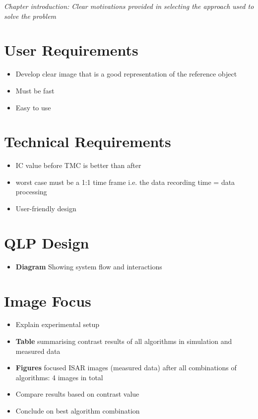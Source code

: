 \documentclass[class=report,11pt,crop=false]{standalone}
\begin{document}
\emph{Chapter introduction: Clear motivations provided in selecting the approach used to solve the problem}

\section{User Requirements}
\begin{itemize}
    \item Develop clear image that is a good representation of the reference object
    \item Must be fast
    \item Easy to use
\end{itemize}

\section{Technical Requirements}
\begin{itemize}
    \item IC value before TMC is better than after
    \item worst case must be a 1:1 time frame i.e. the data recording time = data processing
    \item User-friendly design
\end{itemize}

\section{QLP Design}
\begin{itemize}
    \item \textbf{Diagram} Showing system flow and interactions
\end{itemize}

\section{Image Focus}
\begin{itemize}
    \item Explain experimental setup
    \item \textbf{Table} summarising contrast results of all algorithms in simulation and measured data
    \item \textbf{Figures} focused ISAR images (measured data) after all combinations of algorithms: 4 images in total
    \item Compare results based on contrast value
    \item Conclude on best algorithm combination
\end{itemize}
\end{document}
